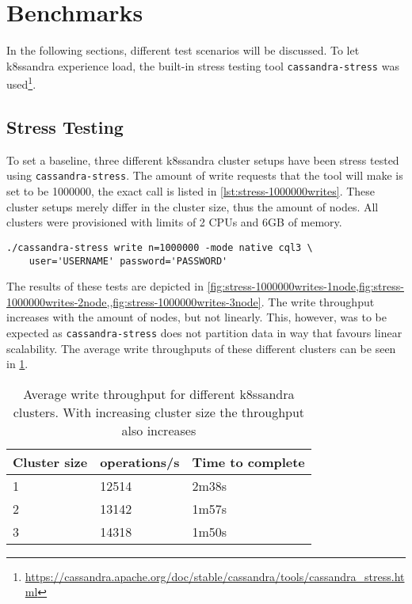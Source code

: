 \section{Benchmarks}

In the following sections, different test scenarios will be discussed. To let k8ssandra experience load, the built-in stress testing tool \texttt{cassandra-stress} was used\footnote{\raggedright\url{https://cassandra.apache.org/doc/stable/cassandra/tools/cassandra_stress.html}}.

\subsection{Stress Testing}
\label{sec:stress-testing}

To set a baseline, three different k8ssandra cluster setups have been stress tested using \texttt{cassandra-stress}. The amount of write requests that the tool will make is set to be 1000000, the exact call is listed in \cref{lst:stress-1000000writes}. These cluster setups merely differ in the cluster size, thus the amount of nodes. All clusters were provisioned with limits of 2 CPUs and 6GB of memory.

\begin{lstlisting}[caption={},
                    captionpos=b,
                    label=lst:stress-1000000writes,
                    float]
./cassandra-stress write n=1000000 -mode native cql3 \
    user='USERNAME' password='PASSWORD'
\end{lstlisting}

The results of these tests are depicted in \cref{fig:stress-1000000writes-1node,fig:stress-1000000writes-2node,,fig:stress-1000000writes-3node}. The write throughput increases with the amount of nodes, but not linearly. This, however, was to be expected as \texttt{cassandra-stress} does not partition data in way that favours linear scalability. The average write throughputs of these different clusters can be seen in \cref{tab:stress-1000000writes-ops}.

\begin{table}[H]
\centering
\begin{tabular}{|l|l|l|}
\hline
\textbf{Cluster size} & \textbf{operations/s} & \textbf{Time to complete} \\ \hline
1                     & 12514                 & 2m38s                     \\ \hline
2                     & 13142                 & 1m57s                     \\ \hline
3                     & 14318                 & 1m50s                     \\ \hline
\end{tabular}
\caption{Average write throughput for different k8ssandra clusters. With increasing cluster size the throughput also increases}
\label{tab:stress-1000000writes-ops}
\end{table}

